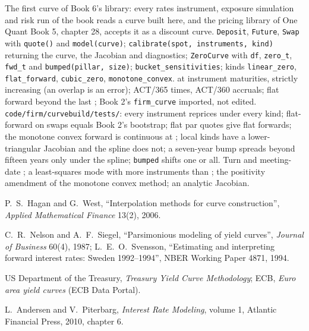 \begin{build}
 The first curve of Book 6's library: every rates instrument,
exposure simulation and risk run of the book reads a curve built here, and the
pricing library of One Quant Book 5, chapter 28, accepts it as a discount
curve.
 \texttt{Deposit}, \texttt{Future}, \texttt{Swap} with
\texttt{quote()} and \texttt{model(curve)}; \texttt{calibrate(spot, instruments,
kind)} returning the curve, the Jacobian and diagnostics; \texttt{ZeroCurve}
with \texttt{df}, \texttt{zero\_t}, \texttt{fwd\_t} and \texttt{bumped(pillar,
size)}; \texttt{bucket\_sensitivities}; kinds \texttt{linear\_zero},
\texttt{flat\_forward}, \texttt{cubic\_zero}, \texttt{monotone\_convex}.
  at instrument maturities, strictly increasing (an
overlap is an error); ACT/365 times, ACT/360 accruals; flat forward beyond the
last ; Book 2's \texttt{firm\_curve} imported, not edited.
 \texttt{code/firm/curvebuild/tests/}: every
instrument reprices under every kind; flat-forward on swaps equals Book 2's
bootstrap; flat par quotes give flat forwards; the monotone convex forward is
continuous at ; local kinds have a lower-triangular Jacobian and the
spline does not; a seven-year bump spreads beyond fifteen years only under the
spline; \texttt{bumped} shifts one  or all.
 Turn and meeting-date ; a least-squares mode with more
instruments than ; the positivity amendment of the monotone convex
method; an analytic Jacobian.
\end{build}

\begin{omsources}
\item P.\ S.\ Hagan and G.\ West, ``Interpolation methods for curve
construction'', \emph{Applied Mathematical Finance} 13(2), 2006.
\item C.\ R.\ Nelson and A.\ F.\ Siegel, ``Parsimonious modeling of yield
curves'', \emph{Journal of Business} 60(4), 1987; L.\ E.\ O.\ Svensson,
``Estimating and interpreting forward interest rates: Sweden 1992--1994'', NBER
Working Paper 4871, 1994.
\item US Department of the Treasury, \emph{Treasury Yield Curve Methodology};
ECB, \emph{Euro area yield curves} (ECB Data Portal).
\item L.\ Andersen and V.\ Piterbarg, \emph{Interest Rate Modeling}, volume 1,
Atlantic Financial Press, 2010, chapter 6.
\end{omsources}

